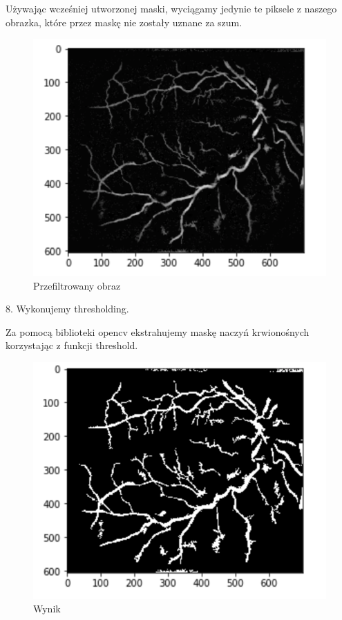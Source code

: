 \documentclass[11pt]{article}
\begin{document}
Używając wcześniej utworzonej maski, wyciągamy jedynie te piksele z naszego obrazka, które przez maskę nie zostały uznane za szum.

\begin{figure}[h]
    \centering
	\includegraphics[scale=0.4]{res/img_pro_7.png}
	\caption{Przefiltrowany obraz}
	\label{fig:demo}
\end{figure}

8. Wykonujemy thresholding.

Za pomocą biblioteki opencv ekstrahujemy maskę naczyń krwionośnych korzystając z funkcji threshold.

\begin{figure}[h]
    \centering
	\includegraphics[scale=0.4]{res/img_pro_8.png}
	\caption{Wynik}
	\label{fig:demo}
\end{figure}
\end{document}
